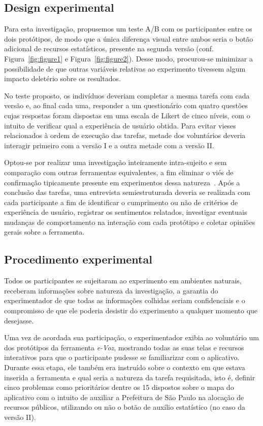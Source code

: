 \documentclass{sigchi}
\begin{document}
\subsection{Design experimental}
Para esta investigação, propusemos um teste A/B com os participantes entre os dois protótipos, de modo que a única diferença visual entre ambos seria o botão adicional de recursos estatísticos, presente na segunda versão (conf. Figura~\ref{fig:figure1} e Figura~\ref{fig:figure2}). Desse modo, procurou-se minimizar a possibilidade de que outras variáveis relativas ao experimento tivessem algum impacto deletério sobre os resultados.

No teste proposto, os indivíduos deveriam completar a mesma tarefa com cada versão e, ao final cada uma, responder a um questionário com quatro questões cujas respostas foram dispostas em uma escala de Likert de cinco níveis, com o intuito de verificar qual a experiência de usuário obtida. Para evitar vieses relacionados à ordem de execução das tarefas, metade dos voluntários deveria interagir primeiro com a versão I e a outra metade com a versão II.

Optou-se por realizar uma investigação inteiramente intra-sujeito e sem comparação com outras ferramentas equivalentes, a fim eliminar o viés de confirmação tipicamente presente em experimentos dessa natureza~\cite{dell:2012}. Após a conclusão das tarefas, uma entrevista semiestruturada deveria se realizada com cada participante a fim de identificar o cumprimento ou não de critérios de experiência de usuário, registrar os sentimentos relatados, investigar eventuais mudanças de comportamento na interação com cada protótipo e coletar opiniões gerais sobre a ferramenta.

\subsection{Procedimento experimental}
Todos os participantes se sujeitaram ao experimento em ambientes naturais, receberam informações sobre natureza da investigação, a garantia do experimentador de que todas as informações colhidas seriam confidenciais e o compromisso de que ele poderia desistir do experimento a qualquer momento que desejasse.

Uma vez de acordada sua participação, o experimentador exibia ao voluntário um dos protótipos da ferramenta \textit{e-Voz}, mostrando todas as suas telas e recursos interativos para que o participante pudesse se familiarizar com o aplicativo. Durante essa etapa, ele também era instruído sobre o contexto em que estava inserida a ferramenta e qual seria a natureza da tarefa requisitada, isto é, definir cinco problemas como prioritários dentre os 15 dispostos sobre o mapa do aplicativo com o intuito de auxiliar a Prefeitura de São Paulo na alocação de recursos públicos, utilizando ou não o botão de auxílio estatístico (no caso da versão II).
\end{document}
